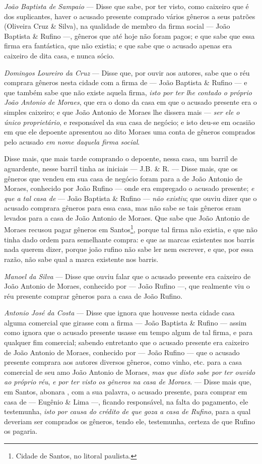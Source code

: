 \emph{João Baptista de Sampaio} --- Disse que sabe, por ter visto, como
caixeiro que é dos suplicantes, haver o acusado presente comprado vários
gêneros a seus patrões (Oliveira Cruz \& Silva), na qualidade de membro
da firma social --- João Baptista \& Rufino ---, gêneros que até hoje não
foram pagos; e que sabe que essa firma era fantástica, que não existia;
e que sabe que o acusado apenas era caixeiro de dita casa, e nunca
sócio.

\emph{Domingos Loureiro da Cruz} --- Disse que, por ouvir aos autores,
sabe que o réu comprara gêneros nesta cidade com a firma de --- João
Baptista \& Rufino --- e que também sabe que não existe aquela firma,
\emph{isto por ter lhe contado o próprio João Antonio de Moraes}, que
era o dono da casa em que o acusado presente era o simples caixeiro; e
que João Antonio de Moraes lhe dissera mais --- \emph{ser ele o único
proprietário}, e responsável da sua casa de negócio; e isto deu-se em
ocasião em que ele depoente apresentou ao dito Moraes uma conta de
gêneros comprados pelo acusado \emph{em nome daquela firma social}.

Disse mais, que mais tarde comprando o depoente, nessa casa, um barril
de aguardente, nesse barril tinha as iniciais --- J.B. \& R. --- Disse
mais, que os gêneros que vendeu em sua casa de negócio foram para a de
João Antonio de Moraes, conhecido por João Rufino --- onde era empregado
o acusado presente; \emph{e que a tal casa de} --- João Baptista \& Rufino
--- \emph{não existiu}; que ouviu dizer que o acusado comprara gêneros
para essa casa, mas não sabe se tais gêneros eram levados para a casa de
João Antonio de Moraes. Que sabe que João Antonio de Moraes recusou
pagar gêneros em Santos\footnote{ Cidade de Santos, no litoral
  paulista.}, porque tal firma não existia, e que não tinha dado ordem
para semelhante compra: e que as marcas existentes nos barris nada
querem dizer, porque joão rufino não sabe ler nem escrever, e que, por
essa razão, não sabe qual a marca existente nos barris.

\emph{Manoel da Silva} --- Disse que ouviu falar que o acusado presente
era caixeiro de João Antonio de Moraes, conhecido por --- João Rufino ---,
que realmente viu o réu presente comprar gêneros para a casa de João
Rufino.

\emph{Antonio José da Costa} --- Disse que ignora que houvesse nesta
cidade casa alguma comercial que girasse com a firma --- João Baptista \&
Rufino --- assim como ignora que o acusado presente usasse em tempo algum
de tal firma, e para qualquer fim comercial; sabendo entretanto que o
acusado presente era caixeiro de João Antonio de Moraes, conhecido por ---
João Rufino --- que o acusado presente comprara aos autores diversos
gêneros, como vinho, etc. para a casa comercial de seu amo João Antonio
de Moraes, \emph{mas que disto sabe por ter ouvido ao próprio réu},
\emph{e por ter visto os gêneros na casa de Moraes}. --- Disse mais que,
em Santos, abonara , com a sua palavra, o acusado presente, para comprar
em casa de --- Eugênio \& Lima ---, ficando responsável, na falta do
pagamento, ele testemunha, \emph{isto por causa do crédito de que goza a
casa de Rufino}, para a qual deveriam ser comprados os gêneros, tendo
ele, testemunha, certeza de que Rufino os pagaria.


